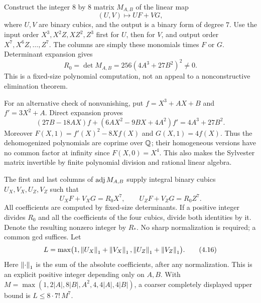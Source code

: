 Construct the integer $8$ by $8$ matrix $M_{A,B}$ of the linear map
\[
 (U,V)\longmapsto UF+VG,
 \tag{4.12}
\]
where $U,V$ are binary cubics, and the output is a binary form of degree
$7$. Use the input order
$X^3,X^2Z,XZ^2,Z^3$ first for $U$, then for $V$, and output order
$X^7,X^6Z,\ldots,Z^7$. The columns are simply these monomials times
$F$ or $G$. Determinant expansion gives
\[
 R_0=\det M_{A,B}=256(4A^3+27B^2)^2\ne0.
 \tag{4.13}\label{eq:resultant}
\]
This is a fixed-size polynomial computation, not an appeal to a
nonconstructive elimination theorem.

For an alternative check of nonvanishing, put $f=X^3+AX+B$ and
$f'=3X^2+A$. Direct expansion proves
\[
 (27B-18AX)f+(6AX^2-9BX+4A^2)f'=4A^3+27B^2.
 \tag{4.14}
\]
Moreover $F(X,1)=f'(X)^2-8Xf(X)$ and $G(X,1)=4f(X)$.
Thus the dehomogenized polynomials are coprime over $\mathbb Q$; their
homogeneous versions have no common factor at infinity since
$F(X,0)=X^4$. This also makes the Sylvester matrix invertible by
finite polynomial division and rational linear algebra.

The first and last columns of $\operatorname{adj} M_{A,B}$ supply integral binary
cubics $U_X,V_X,U_Z,V_Z$ such that
\[
 U_XF+V_XG=R_0X^7,\qquad
 U_ZF+V_ZG=R_0Z^7.
 \tag{4.15}\label{eq:bezout7}
\]
All coefficients are computed by fixed-size determinants. If a positive
integer divides $R_0$ and all the coefficients of the four cubics, divide
both identities by it. Denote the resulting nonzero integer by $R_*$.
No sharp normalization is required; a common gcd suffices.
Let
\[
 L=\max\bigl(1,\left\lVert U_X\right\rVert_1+\left\lVert V_X\right\rVert_1,
                   \left\lVert U_Z\right\rVert_1+\left\lVert V_Z\right\rVert_1\bigr).
 \tag{4.16}\label{eq:L}
\]
Here $\left\lVert\cdot\right\rVert_1$ is the sum of the absolute coefficients, after any
normalization. This is an explicit positive integer depending only on
$A,B$. With
$M=\max(1,2|A|,8|B|,A^2,4,4|A|,4|B|)$, a coarser completely
displayed upper bound is $L\le8\cdot7!\,M^7$.

